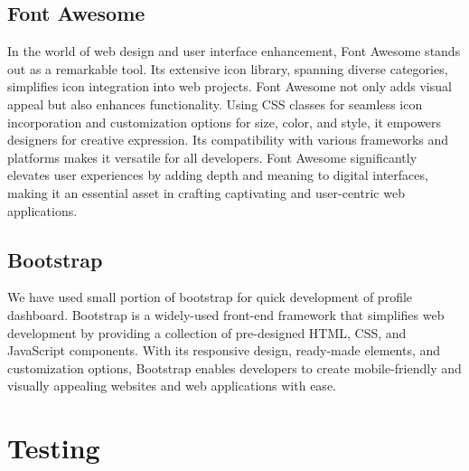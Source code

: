 \subsection{Font Awesome }
In the world of web design and user interface enhancement, Font Awesome stands out as a remarkable tool. Its extensive icon library, spanning diverse categories, simplifies icon integration into web projects. Font Awesome not only adds visual appeal but also enhances functionality. Using CSS classes for seamless icon incorporation and customization options for size, color, and style, it empowers designers for creative expression. Its compatibility with various frameworks and platforms makes it versatile for all developers. Font Awesome significantly elevates user experiences by adding depth and meaning to digital interfaces, making it an essential asset in crafting captivating and user-centric web applications.
\subsection{Bootstrap}
We have used small portion of bootstrap for quick development of profile dashboard. Bootstrap is a widely-used front-end framework that simplifies web development by providing a collection of pre-designed HTML, CSS, and JavaScript components. With its responsive design, ready-made elements, and customization options, Bootstrap enables developers to create mobile-friendly and visually appealing websites and web applications with ease.
\section{Testing}
